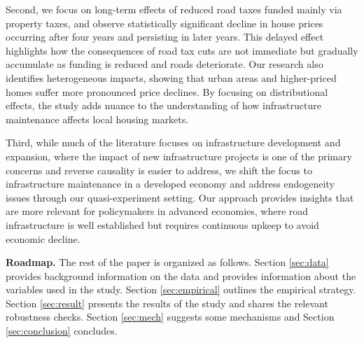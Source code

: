 Second, we focus on long-term effects of reduced road taxes funded mainly via property taxes, and observe statistically significant decline in house prices occurring after four years and persisting in later years. This delayed effect highlights how the consequences of road tax cuts are not immediate but gradually accumulate as funding is reduced and roads deteriorate. Our research also identifies heterogeneous impacts, showing that urban areas and higher-priced homes suffer more pronounced price declines. By focusing on distributional effects, the study adds nuance to the understanding of how infrastructure maintenance affects local housing markets.

Third, while much of the literature focuses on infrastructure development and expansion, where the impact of new infrastructure projects is one of the primary concerns and reverse causality is easier to address, we shift the focus to infrastructure maintenance in a developed economy and address endogeneity issues through our quasi-experiment setting. Our approach provides insights that are more relevant for policymakers in advanced economies, where road infrastructure is well established but requires continuous upkeep to avoid economic decline.

{\bf Roadmap.} The rest of the paper is organized as follows. Section \ref{sec:data} provides background information on the data and provides information about the variables used in the study. Section \ref{sec:empirical} outlines the empirical strategy. Section \ref{sec:result} presents the results of the study and shares the relevant robustness checks. Section \ref{sec:mech} suggests some mechanisms and Section \ref{sec:conclusion} concludes.